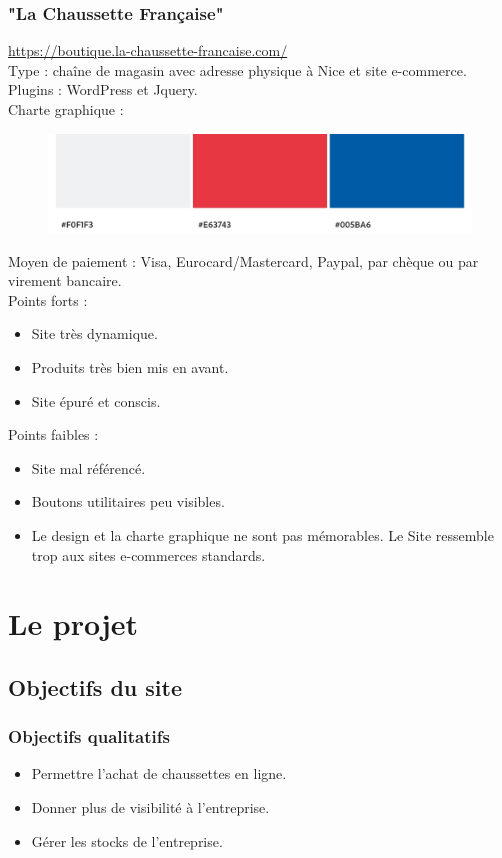\documentclass[a4paper, 12pt]{article}
\begin{document}
\subsubsection{"La Chaussette Française"}
\url{https://boutique.la-chaussette-francaise.com/}\\
Type : chaîne de magasin avec adresse physique à Nice et site e-commerce.\\
Plugins : WordPress et Jquery.\\
Charte graphique :
\begin{figure}[H]
    \centering
    \includegraphics[scale=0.4]{theme_chaussette_francaise.jpeg}
\end{figure}
Moyen de paiement : Visa, Eurocard/Mastercard, Paypal, par chèque ou par virement bancaire.\\
Points forts :
\begin{itemize}
    \item Site très dynamique.
    \item Produits très bien mis en avant.
    \item Site épuré et conscis.
\end{itemize}
Points faibles :
\begin{itemize}
    \item Site mal référencé.
    \item Boutons utilitaires peu visibles.
    \item Le design et la charte graphique ne sont pas mémorables. Le Site ressemble trop aux sites e-commerces standards.
\end{itemize}
\newpage
\section{Le projet}
\subsection{Objectifs du site}
\subsubsection{Objectifs qualitatifs}
\begin{itemize}
    \item Permettre l'achat de chaussettes en ligne.
    \item Donner plus de visibilité à l'entreprise.
    \item Gérer les stocks de l'entreprise.
\end{itemize}
\end{document}
